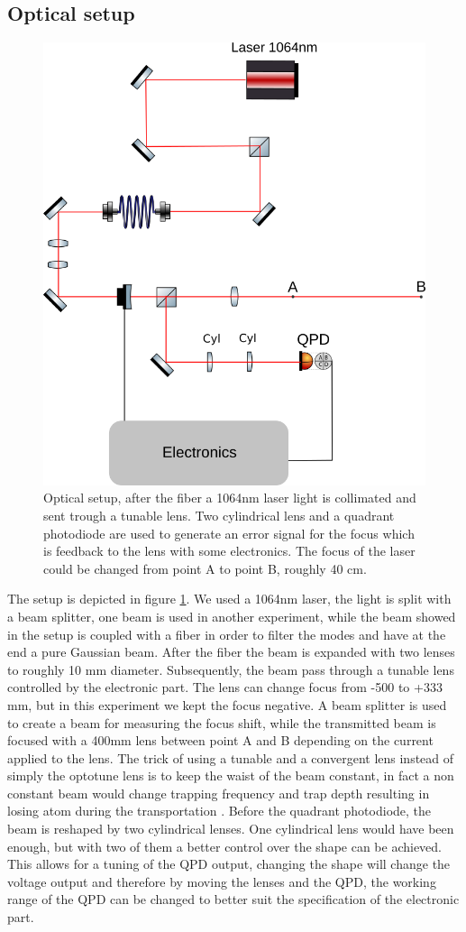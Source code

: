 \documentclass[a4paper,10pt]{article}
\begin{document}
\subsection{Optical setup}
\begin{figure}
\centering
\includegraphics[width = .5\textwidth]{opticsetup}
\caption{Optical setup, after the fiber a 1064nm laser light is collimated and sent trough a tunable lens. Two cylindrical lens and a quadrant photodiode are used to generate an error signal for the focus which is feedback to the lens with some electronics. The focus of the laser could be changed from point A to point B, roughly 40 cm.} \label{img:opticsetup}
\end{figure}
The setup is depicted in figure \ref{img:opticsetup}. We used a 1064nm laser, the light is split with a beam splitter, one beam is used in another experiment, while the beam showed in the setup is coupled with a fiber in order to filter the modes and have at the end a pure Gaussian beam. After the fiber the beam is expanded with two lenses to roughly 10 mm diameter. Subsequently, the beam pass through a tunable lens controlled by the electronic part. The lens can change focus from  -500 to +333 mm, but in this experiment we kept the focus negative. A beam splitter is used to create a beam for measuring the focus shift, while the transmitted beam is focused with a 400mm lens between point A and B depending on the current applied to the lens. The trick of using a tunable and a convergent lens instead of simply the optotune lens is to keep the waist of the beam constant, in fact a non constant beam would change trapping frequency and trap depth resulting in losing atom during the transportation \cite{opticaltransportation}.  Before the quadrant photodiode, the beam is reshaped by two cylindrical lenses. One cylindrical lens would have been enough, but with two of them a better control over the shape can be achieved. This allows for a tuning of the QPD output, changing the shape will change the voltage output and therefore by moving the lenses and the QPD, the working range of the QPD can be changed to better suit the specification of the electronic part.
\end{document}
